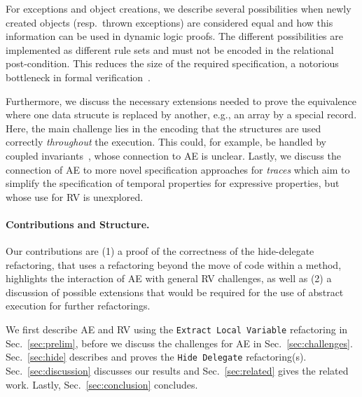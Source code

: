For exceptions and object creations, we describe several possibilities when newly created objects (resp.\ thrown exceptions) are considered equal
and how this information can be used in dynamic logic proofs. The different possibilities are implemented as different rule sets and must not be encoded
in the relational post-condition. This reduces the size of the required specification, a notorious bottleneck in formal verification~\cite{DBLP:journals/corr/abs-1211-6186,DBLP:series/lncs/HahnleH19}.


Furthermore, we discuss the necessary extensions needed to prove the equivalence where one data strucute is replaced by another, e.g., an array by a special record.
Here, the main challenge lies in the encoding that the structures are used correctly \emph{throughout} the execution. This could, for example, be handled by coupled invariants~\cite{DBLP:conf/birthday/BeckertU18}, whose connection to AE is unclear. 
Lastly, we discuss the connection of AE to more novel specification approaches for \emph{traces} which aim to simplify the specification of temporal properties for expressive properties, but whose use for RV is unexplored.

\paragraph{Contributions and Structure.}
Our contributions are (1) a proof of the correctness of the hide-delegate refactoring, that uses a refactoring beyond the move of code within a method, highlights the interaction of AE with general RV challenges, as well as (2) a discussion of possible extensions that would be required for the use of abstract execution for further refactorings.

We first describe AE and RV using the \texttt{Extract Local Variable} refactoring in Sec.~\ref{sec:prelim}, before we discuss the challenges for AE in Sec.~\ref{sec:challenges}. Sec.~\ref{sec:hide} describes and proves the \texttt{Hide Delegate} refactoring(s). Sec.~\ref{sec:discussion} discusses our results and Sec.~\ref{sec:related} gives the related work. Lastly, Sec.~\ref{sec:conclusion} concludes.



